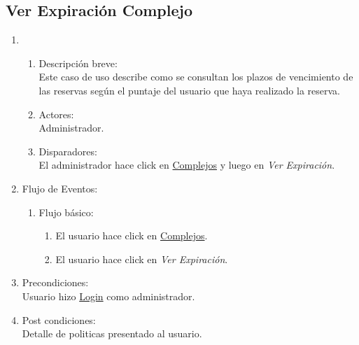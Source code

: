 \documentclass[a4paper,11pt]{article}
\begin{document}
\subsection{Ver Expiraci\'on Complejo}
\begin{enumerate}
    \item
    \begin{enumerate}
    \item Descripci\'on breve: \\
        Este caso de uso describe como se consultan los plazos de vencimiento de
        las reservas seg\'un el puntaje del usuario que haya realizado la reserva.
    \item Actores: \\
        Administrador.
    \item Disparadores: \\
        El administrador hace click en \underline{Complejos} y luego en \emph{Ver Expiraci\'on}.
    \end{enumerate}
    \item Flujo de Eventos: 
    \begin{enumerate}
        \item Flujo b\'asico:
		\begin{enumerate}
            		\item El usuario hace click en \underline{Complejos}.
            		\item El usuario hace click en \emph{Ver Expiraci\'on}.
		\end{enumerate}
    \end{enumerate}
    \item Precondiciones: \\
        Usuario hizo \underline{Login} como administrador.\\
    \item Post condiciones: \\
	Detalle de politicas presentado al usuario.
\end{enumerate}

\end{document}
